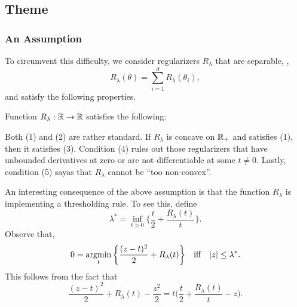 \subsection{Theme}

\subsubsection{An Assumption}

To circumvent this difficulty,
we consider regularizers $R_\lambda$ that are separable,
\ie,
\begin{equation}
    R_\lambda(\theta)=\sum_{i=1}^d R_\lambda(\theta_i),
\end{equation}
and satisfy the following properties.
\begin{ass}
Function $R_\lambda:{\mathbb{R}}\to{\mathbb{R}}$ satisfies the following:
\end{ass}

Both (1) and (2) are rather standard.
If $R_\lambda$ is concave on ${\mathbb{R}}_+$ and satisfies (1),
then it satisfies (3).
Condition (4) rules out those regularizers that have unbounded derivatives
at zero or are not differentiable at some $t\ne0$.
Lastly,
condition (5) sayas that $R_\lambda$ cannot be ``too non-convex''.

An interesting consequence of the above assumption is that
the function $R_\lambda$ is implementing a thresholding rule.
To see this,
define
\begin{equation}
    \lambda^*=\inf_{t>0}\bigg\{\frac{t}{2}+\frac{R_\lambda(t)}{t}\bigg\}.
\end{equation}
Observe that,
\begin{equation}
    0=\mathop{\mathrm{argmin}}_t\bigg\{\frac{(z-t)^2}{2}+R_\lambda(t)\bigg\}\quad
    \text{iff}\quad|z|\le\lambda^*.
\end{equation}
This follows from the fact that
\begin{equation}
    \frac{(z-t)^2}{2}+R_\lambda(t)-\frac{z^2}{2}
        =t\bigg(\frac{t}{2}+\frac{R_\lambda(t)}{t}-z\bigg).
\end{equation}

